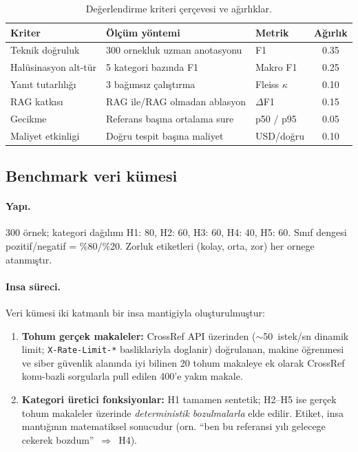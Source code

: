 \documentclass[11pt,a4paper]{article}
\begin{document}
\begin{table}[t]
\caption{Değerlendirme kriteri çerçevesi ve ağırlıklar.}
\label{tab:kriter}\small
\begin{tabularx}{\columnwidth}{l X l c}
\toprule
\textbf{Kriter} & \textbf{Ölçüm yöntemi} & \textbf{Metrik} & \textbf{Ağırlık} \\
\midrule
Teknik doğruluk        & 300 ornekluk uzman anotasyonu & F1            & 0.35 \\
Halüsinasyon alt-tür   & 5 kategori bazında F1         & Makro F1      & 0.25 \\
Yanıt tutarlılığı      & 3 bağımsız çalıştırma         & Fleiss $\kappa$ & 0.10 \\
RAG katkısı            & RAG ile/RAG olmadan ablasyon  & $\Delta$F1    & 0.15 \\
Gecikme                & Referans başına ortalama sure & p50 / p95     & 0.05 \\
Maliyet etkinligi      & Doğru tespit başına maliyet   & USD/doğru     & 0.10 \\
\bottomrule
\end{tabularx}
\end{table}

\subsection{Benchmark veri kümesi}
\label{sub:dataset}
\paragraph{Yapı.} 300 örnek; kategori dağılımı H1: 80, H2: 60, H3: 60, H4: 40,
H5: 60. Sınıf dengesi pozitif/negatif = \%80/\%20. Zorluk etiketleri (kolay,
orta, zor) her ornege atanmıştır.

\paragraph{Insa süreci.} Veri kümesi iki katmanlı bir insa mantigiyla
oluşturulmuştur:

\begin{enumerate}[nosep]
\item \textbf{Tohum gerçek makaleler:} CrossRef API üzerinden ($\sim$50~istek/sn
dinamik limit; \texttt{X-Rate-Limit-*} basliklariyla doglanir) doğrulanan,
makine öğrenmesi ve siber güvenlik alanında iyi bilinen 20 tohum makaleye ek
olarak CrossRef konu-bazli sorgularla pull edilen 400'e yakın makale.
\item \textbf{Kategori üretici fonksiyonlar:} H1 tamamen sentetik;
H2--H5 ise gerçek tohum makaleler üzerinde \emph{deterministik bozulmalarla}
elde edilir. Etiket, insa mantığının matematiksel sonucudur (orn. ``ben bu
referansi yılı gelecege cekerek bozdum''~$\Rightarrow$~H4).
\end{enumerate}
\end{document}
